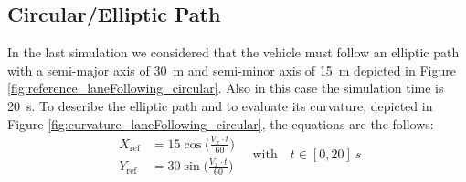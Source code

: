\subsection{Circular/Elliptic Path}
In the last simulation we considered that the vehicle must follow an elliptic path with a semi-major axis of \SI{30}{m} and semi-minor axis of \SI{15}{m} depicted in Figure \ref{fig:reference_laneFollowing_circular}. Also in this case the simulation time is \SI{20}{s}.
To describe the elliptic path and to evaluate its curvature, depicted in Figure \ref{fig:curvature_laneFollowing_circular}, the equations are the follows:
\begin{equation}
	\begin{aligned}
	X_\text{ref}&=\displaystyle 15\cos\Big(\frac{V_x\cdot t}{60}\Big)\\
	Y_\text{ref}&=\displaystyle 30\sin\Big(\frac{V_x\cdot t}{60}\Big)  
	\end{aligned} \quad\text{with}\quad t\in[0,20]\SI{}{s}
\end{equation}
